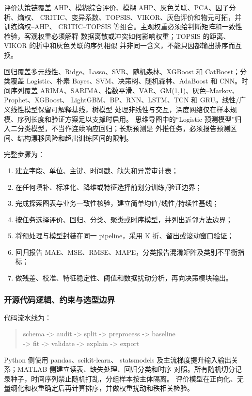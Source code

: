 \documentclass[UTF8,a4paper,12pt]{ctexart}
\begin{document}
评价决策链覆盖 AHP、模糊综合评价、模糊 AHP、灰色关联、PCA、因子分析、熵权、
CRITIC、变异系数、TOPSIS、VIKOR、灰色评价和物元可拓，并训练熵权--AHP、
CRITIC--TOPSIS 等组合。主观权重必须给判断矩阵和一致性检验，客观权重必须解释
数据离散或冲突如何影响权重；TOPSIS 的距离、VIKOR 的折中和灰色关联的序列相似
并非同一含义，不能只因都输出排序而互换。

回归覆盖多元线性、Ridge、Lasso、SVR、随机森林、XGBoost 和 CatBoost；分类覆盖
Logistic、朴素 Bayes、SVM、决策树、随机森林、AdaBoost 和 CNN。时间序列覆盖
ARIMA、SARIMA、指数平滑、VAR、GM(1,1)、灰色--Markov、Prophet、XGBoost、
LightGBM、BP、RNN、LSTM、TCN 和 GRU。线性/广义线性模型保留可解释基线，树模型
处理非线性与交互，深度网络仅在样本规模、序列长度和验证方案足以支撑时启用。
思维导图中的“Logistic 预测模型”归入二分类模型，不当作连续响应回归；长期预测是
外推任务，必须报告预测区间、结构漂移风险和超出训练区间的限制。

完整步骤为：
\begin{enumerate}
  \item 建立字段、单位、主键、时间戳、缺失和异常审计表；
  \item 在任何填补、标准化、降维或特征选择前划分训练/验证边界；
  \item 完成探索图表与业务一致性核验，建立简单均值/线性/持续性基线；
  \item 按任务选择评价、回归、分类、聚类或时序模型，并列出近邻方法边界；
  \item 将预处理与模型封装在同一 pipeline，采用 K 折、留出或滚动窗口验证；
  \item 回归报告 MAE、MSE、RMSE、MAPE，分类报告混淆矩阵及类别不平衡指标；
  \item 做残差、校准、特征稳定性、阈值和数据扰动分析，再向决策模块输出。
\end{enumerate}

\subsubsection{开源代码逻辑、约束与选型边界}

代码流水线为：
\begin{quote}
\small\ttfamily
schema -> audit -> split -> preprocess -> baseline\\
-> fit -> validate -> explain -> export
\end{quote}
Python 侧使用 pandas、scikit-learn、
statsmodels 及主流梯度提升输入输出关系；MATLAB 侧建立读表、缺失处理、回归分类和时序
对照。所有随机切分记录种子，时间序列禁止随机打乱，分组样本按主体隔离。
评价模型在正向化、无量纲化和权重确定后再计算排序，并做权重扰动和秩相关检验。
\end{document}
